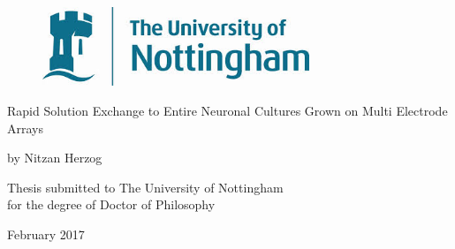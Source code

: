 \begin{titlepage}

\begin{figure}[h]
\centering
\includegraphics[width=8cm]{UoN_logo.jpg}
\end{figure}

\Huge
\begin{center}

\vspace{4cm}
Rapid Solution Exchange to Entire Neuronal Cultures Grown on Multi Electrode Arrays

\vspace{3cm}

\LARGE

by Nitzan Herzog

\vspace{3cm}


Thesis submitted to The University of Nottingham \\
for the degree of Doctor of Philosophy


\vspace{1.5cm}
\large
February 2017





\end{center}

\end{titlepage}
